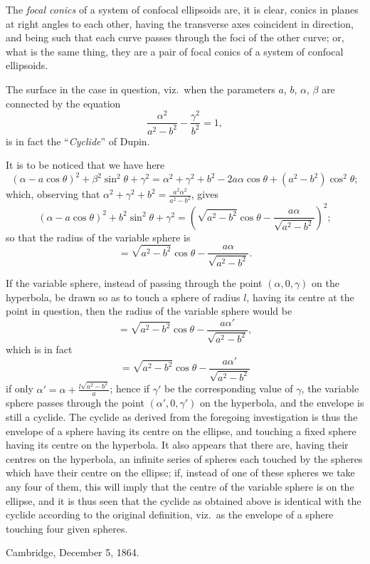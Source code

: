 \documentclass[11pt,a4paper]{article}
\theoremstyle{plain}
\begin{document}
The \textit{focal conics} of a system of confocal ellipsoids are, it is clear, conics in planes at right angles to each other, having the transverse axes coincident in direction, and being such that each curve passes through the foci of the other curve; or, what is the same thing, they are a pair of focal conics of a system of confocal ellipsoids.

The surface in the case in question, viz.\ when the parameters $a$, $b$, $\alpha$, $\beta$ are connected by the equation
\[
\frac{\alpha^2}{a^2 - b^2} - \frac{\gamma^2}{b^2} = 1,
\]
is in fact the ``\textit{Cyclide}'' of Dupin.

It is to be noticed that we have here
\[
(\alpha - a\cos\theta)^2 + \beta^2\sin^2\theta + \gamma^2 = \alpha^2 + \gamma^2 + b^2 - 2a\alpha\cos\theta + (a^2 - b^2)\cos^2\theta;
\]
which, observing that $\alpha^2 + \gamma^2 + b^2 = \frac{a^2\alpha^2}{a^2 - b^2}$, gives
\[
(\alpha - a\cos\theta)^2 + b^2\sin^2\theta + \gamma^2 = (\sqrt{a^2 - b^2}\cos\theta - \frac{a\alpha}{\sqrt{a^2 - b^2}})^2;
\]
so that the radius of the variable sphere is
\[
= \sqrt{a^2 - b^2}\cos\theta - \frac{a\alpha}{\sqrt{a^2 - b^2}}.
\]

If the variable sphere, instead of passing through the point $(\alpha, 0, \gamma)$ on the hyperbola, be drawn so as to touch a sphere of radius $l$, having its centre at the point in question, then the radius of the variable sphere would be
\[
= \sqrt{a^2 - b^2}\cos\theta - \frac{a\alpha'}{\sqrt{a^2 - b^2}},
\]
which is in fact
\[
= \sqrt{a^2 - b^2}\cos\theta - \frac{a\alpha'}{\sqrt{a^2 - b^2}}
\]
if only $\alpha' = \alpha + \frac{l\sqrt{a^2 - b^2}}{a}$; hence if $\gamma'$ be the corresponding value of $\gamma$, the variable sphere passes through the point $(\alpha', 0, \gamma')$ on the hyperbola, and the envelope is still a cyclide. The cyclide as derived from the foregoing investigation is thus the envelope of a sphere having its centre on the ellipse, and touching a fixed sphere having its centre on the hyperbola. It also appears that there are, having their centres on the hyperbola, an infinite series of spheres each touched by the spheres which have their centre on the ellipse; if, instead of one of these spheres we take any four of them, this will imply that the centre of the variable sphere is on the ellipse, and it is thus seen that the cyclide as obtained above is identical with the cyclide according to the original definition, viz.\ as the envelope of a sphere touching four given spheres.

\begin{flushright}
Cambridge, December 5, 1864.
\end{flushright}
\end{document}
